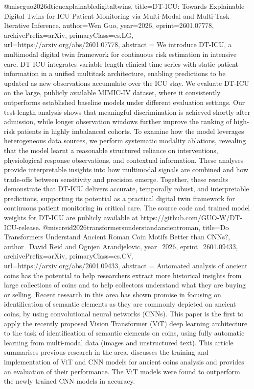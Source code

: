 {}@misc{guo2026dticuexplainabledigitaltwins,
      title={DT-ICU: Towards Explainable Digital Twins for ICU Patient Monitoring via Multi-Modal and Multi-Task Iterative Inference}, 
      author={Wen Guo},
      year={2026},
      eprint={2601.07778},
      archivePrefix={arXiv},
      primaryClass={cs.LG},
      url={https://arxiv.org/abs/2601.07778},
      abstract = {We introduce DT-ICU, a multimodal digital twin framework for continuous risk estimation in intensive care. DT-ICU integrates variable-length clinical time series with static patient information in a unified multitask architecture, enabling predictions to be updated as new observations accumulate over the ICU stay. We evaluate DT-ICU on the large, publicly available MIMIC-IV dataset, where it consistently outperforms established baseline models under different evaluation settings. Our test-length analysis shows that meaningful discrimination is achieved shortly after admission, while longer observation windows further improve the ranking of high-risk patients in highly imbalanced cohorts. To examine how the model leverages heterogeneous data sources, we perform systematic modality ablations, revealing that the model learnt a reasonable structured reliance on interventions, physiological response observations, and contextual information. These analyses provide interpretable insights into how multimodal signals are combined and how trade-offs between sensitivity and precision emerge. Together, these results demonstrate that DT-ICU delivers accurate, temporally robust, and interpretable predictions, supporting its potential as a practical digital twin framework for continuous patient monitoring in critical care. The source code and trained model weights for DT-ICU are publicly available at https://github.com/GUO-W/DT-ICU-release.}
}@misc{reid2026transformersunderstandancientroman,
      title={Do Transformers Understand Ancient Roman Coin Motifs Better than CNNs?}, 
      author={David Reid and Ognjen Arandjelovic},
      year={2026},
      eprint={2601.09433},
      archivePrefix={arXiv},
      primaryClass={cs.CV},
      url={https://arxiv.org/abs/2601.09433},
      abstract = {Automated analysis of ancient coins has the potential to help researchers extract more historical insights from large collections of coins and to help collectors understand what they are buying or selling. Recent research in this area has shown promise in focusing on identification of semantic elements as they are commonly depicted on ancient coins, by using convolutional neural networks (CNNs). This paper is the first to apply the recently proposed Vision Transformer (ViT) deep learning architecture to the task of identification of semantic elements on coins, using fully automatic learning from multi-modal data (images and unstructured text). This article summarises previous research in the area, discusses the training and implementation of ViT and CNN models for ancient coins analysis and provides an evaluation of their performance. The ViT models were found to outperform the newly trained CNN models in accuracy.}
}
